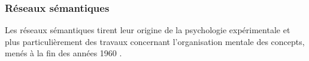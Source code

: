 
  
  



  
  


\subsubsection{Réseaux sémantiques}\label{sec:reseaux-semantiques}

Les réseaux sémantiques tirent leur origine de la psychologie
expérimentale et plus particulièrement des travaux concernant
l'organisation mentale des concepts, menés à la fin des années 1960  \cite{Quillian1968}.




